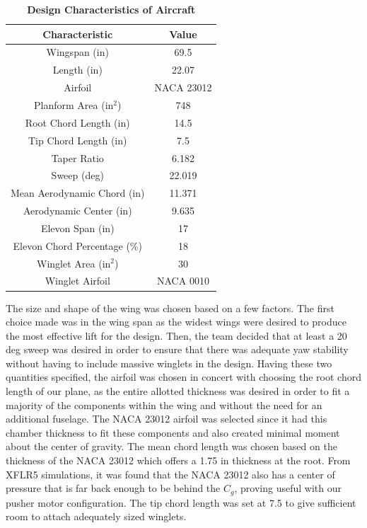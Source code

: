     \begin{table}[H]
    \begin{center}
    \caption{\textbf{Design Characteristics of Aircraft}} \label{table:design_char}
    \begin{tabular}{|c|c|} 
        \hline
        \textbf{Characteristic} & \textbf{Value} \\ \hline
        Wingspan (in) & 69.5 \\ \hline
        Length (in) & 22.07 \\ \hline
        Airfoil & NACA 23012 \\ \hline
        Planform Area (in$^2$) & 748 \\ \hline
        Root Chord Length (in) & 14.5 \\ \hline
        Tip Chord Length (in) & 7.5 \\ \hline
        Taper Ratio & 6.182 \\ \hline
        Sweep (deg) & 22.019 \\ \hline
        Mean Aerodynamic Chord (in) &  11.371 \\ \hline
        Aerodynamic Center (in) & 9.635 \\ \hline
        Elevon Span (in) & 17 \\ \hline
        Elevon Chord Percentage (\%) & 18 \\ \hline
        Winglet Area (in$^2$) & 30 \\ \hline
        Winglet Airfoil & NACA 0010 \\
        \hline
    \end{tabular}
    \end{center}
    \end{table}

    The size and shape of the wing was chosen based on a few factors. The first choice made was in the wing span as the widest wings were desired to produce the most effective lift for the design. Then, the team decided that at least a 20 deg sweep was desired in order to ensure that there was adequate yaw stability without having to include massive winglets in the design. Having these two quantities specified, the airfoil was chosen in concert with choosing the root chord length of our plane, as the entire allotted thickness was desired in order to fit a majority of the components within the wing and without the need for an additional fuselage. The NACA 23012 airfoil was selected since it had this chamber thickness to fit these components and also created minimal moment about the center of gravity. The mean chord length was chosen based on the thickness of the NACA 23012 which offers a 1.75 in thickness at the root. From XFLR5 simulations, it was found that the NACA 23012 also has a center of pressure that is far back enough to be behind the $C_g$, proving useful with our pusher motor configuration. The tip chord length was set at 7.5 to give sufficient room to attach adequately sized winglets. 

